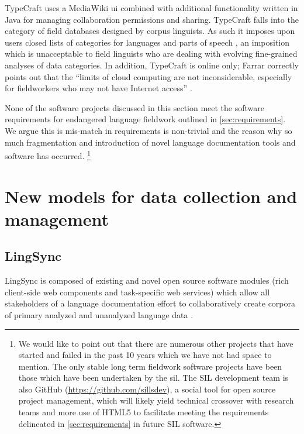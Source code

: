 \documentclass[11pt]{article}
\begin{document}
TypeCraft uses a MediaWiki \gls{ui} combined with additional functionality
written in Java for managing collaboration permissions and sharing. TypeCraft
falls into the category of field databases designed by corpus linguists. As
such it imposes upon users closed lists of categories for languages and parts
of speech \cite{Farrar:2010}, an imposition which is unacceptable to field
linguists who are dealing with evolving fine-grained analyses of data
categories. In addition, TypeCraft is online only; Farrar correctly points out
that the ``limits of cloud computing are not inconsiderable, especially for
fieldworkers who may not have Internet access'' \cite{Farrar:2010}.

None of the software projects discussed in this section meet the software requirements for endangered language fieldwork outlined in \autoref{sec:requirements}.  We
argue this is mis-match in requirements is non-trivial and the reason why so much fragmentation and introduction of novel
language documentation tools and software has occurred.%
\footnote{We would like to point out that there are numerous other projects that have started and failed in the past 10 years which we have not had space to mention. The only stable
long term fieldwork software projects have been those which have been undertaken by the \gls{sil}.  
The SIL development team is also GitHub (\url{https://github.com/sillsdev}), a social tool for open source
    project management, which will likely yield technical crossover with research
    teams and more use of HTML5 to facilitate meeting the requirements
delineated in \autoref{sec:requirements} in future SIL software.} %



\section{New models for data collection and management}
\label{sec:lingsync-old}


\subsection{LingSync}\label{sec:lingsync}

LingSync is
composed of existing and novel open source software modules (rich client-side
web components and task-specific web services) which allow all stakeholders of
a language documentation effort to collaboratively create corpora of primary
analyzed and unanalyzed language data \cite{lingsync:2012}.
\end{document}
